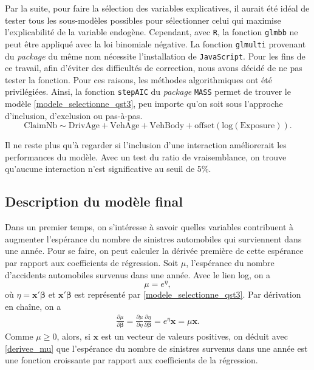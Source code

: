 \documentclass{article}
\begin{document}
	Par la suite, pour faire la sélection des variables explicatives, il aurait été idéal de tester tous les sous-modèles possibles pour sélectionner celui qui maximise l'explicabilité de la variable endogène. Cependant, avec \texttt{R}, la fonction \texttt{glmbb} ne peut être appliqué avec la loi binomiale négative. 
	La fonction \texttt{glmulti} provenant du \textit{package} du même nom nécessite l'installation de \texttt{JavaScript}. Pour les fins de ce travail, afin d'éviter des difficultés de correction, nous avons décidé de ne pas tester la fonction.
	Pour ces raisons, les méthodes algorithmiques ont été privilégiées. Ainsi, la fonction \texttt{stepAIC} du \textit{package} \texttt{MASS} permet de trouver le modèle \eqref{modele_selectionne_qst3}, peu importe qu'on soit sous l'approche d'inclusion, d'exclusion ou pas-à-pas.
	\begin{equation}\label{modele_selectionne_qst3}
		\mathrm{ClaimNb} \sim \mathrm{DrivAge + VehAge + VehBody + offset(log(Exposure))}.
	\end{equation}
	
	Il ne reste plus qu'à regarder si l'inclusion d'une interaction améliorerait les performances du modèle.
	Avec un test du ratio de vraisemblance, on trouve qu'aucune interaction n'est significative au seuil de 5\%.
	
	\subsection{Description du modèle final}
	Dans un premier temps, on s'intéresse à savoir quelles variables contribuent à augmenter l'espérance du nombre de sinistres automobiles qui surviennent dans une année. Pour se faire, on peut calculer la dérivée première de cette espérance par rapport aux coefficients de régression.
	Soit $\mu$, l'espérance du nombre d'accidents automobiles survenus dans une année. Avec le lien log, on a
	\begin{equation}\label{lien_log}
		\mu = e^{\eta},
	\end{equation} 
	où $\eta = \boldsymbol{x'\beta}$ et $\boldsymbol{x'\beta}$ est représenté par \eqref{modele_selectionne_qst3}. Par dérivation en chaîne, on a
	\begin{align}\label{derivee_mu}
		\frac{\partial \mu}{\partial \boldsymbol{\beta}} = \frac{\partial \mu}{\partial \eta}\frac{\partial \eta}{\partial \boldsymbol{\beta}} = e^\eta \boldsymbol{x} = \mu\boldsymbol{x}.
	\end{align}
	Comme $\mu\geq0$, alors, si $\boldsymbol{x}$ est un vecteur de valeurs positives, on déduit avec \eqref{derivee_mu} que l'espérance du nombre de sinistres survenus dans une année est une fonction croissante par rapport aux coefficients de la régression.\\
	
\end{document}
